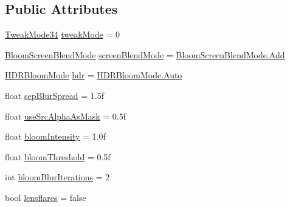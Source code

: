 \subsection*{Public Attributes}
\begin{DoxyCompactItemize}
\item 
\mbox{\hyperlink{namespace_unity_standard_assets_1_1_image_effects_aad04ccb197e6c2c9f40afbbc5f387460}{Tweak\+Mode34}} \mbox{\hyperlink{class_unity_standard_assets_1_1_image_effects_1_1_bloom_and_flares_a74a32b2fcaeea91d0554b4e11b96c39b}{tweak\+Mode}} = 0
\item 
\mbox{\hyperlink{namespace_unity_standard_assets_1_1_image_effects_a02785e2abb5d4a7cd6d77453b2298730}{Bloom\+Screen\+Blend\+Mode}} \mbox{\hyperlink{class_unity_standard_assets_1_1_image_effects_1_1_bloom_and_flares_a612b26ac43c7f909d4332c0ea54f2e52}{screen\+Blend\+Mode}} = \mbox{\hyperlink{namespace_unity_standard_assets_1_1_image_effects_a02785e2abb5d4a7cd6d77453b2298730aec211f7c20af43e742bf2570c3cb84f9}{Bloom\+Screen\+Blend\+Mode.\+Add}}
\item 
\mbox{\hyperlink{namespace_unity_standard_assets_1_1_image_effects_a80dad9689d9811c8715cc09830fc8b1d}{H\+D\+R\+Bloom\+Mode}} \mbox{\hyperlink{class_unity_standard_assets_1_1_image_effects_1_1_bloom_and_flares_ac3fcdb8cd742b51fdc9f9f0cc2d8e9f7}{hdr}} = \mbox{\hyperlink{namespace_unity_standard_assets_1_1_image_effects_a80dad9689d9811c8715cc09830fc8b1da06b9281e396db002010bde1de57262eb}{H\+D\+R\+Bloom\+Mode.\+Auto}}
\item 
float \mbox{\hyperlink{class_unity_standard_assets_1_1_image_effects_1_1_bloom_and_flares_a1fee665bf1fdd9e1ec47711ca90624a0}{sep\+Blur\+Spread}} = 1.\+5f
\item 
float \mbox{\hyperlink{class_unity_standard_assets_1_1_image_effects_1_1_bloom_and_flares_a8df7f61e10eaaa321399dc74c76b3b3a}{use\+Src\+Alpha\+As\+Mask}} = 0.\+5f
\item 
float \mbox{\hyperlink{class_unity_standard_assets_1_1_image_effects_1_1_bloom_and_flares_a772aaf2be190cdfde6c105253750fdda}{bloom\+Intensity}} = 1.\+0f
\item 
float \mbox{\hyperlink{class_unity_standard_assets_1_1_image_effects_1_1_bloom_and_flares_a4d264106d882ddbd47081646bbd77e20}{bloom\+Threshold}} = 0.\+5f
\item 
int \mbox{\hyperlink{class_unity_standard_assets_1_1_image_effects_1_1_bloom_and_flares_a5d2299d44dda31ac0f204589798f86bd}{bloom\+Blur\+Iterations}} = 2
\item 
bool \mbox{\hyperlink{class_unity_standard_assets_1_1_image_effects_1_1_bloom_and_flares_af9def87b2c6b8e65fad958c52fb1cf7b}{lensflares}} = false

\end{DoxyCompactItemize}
